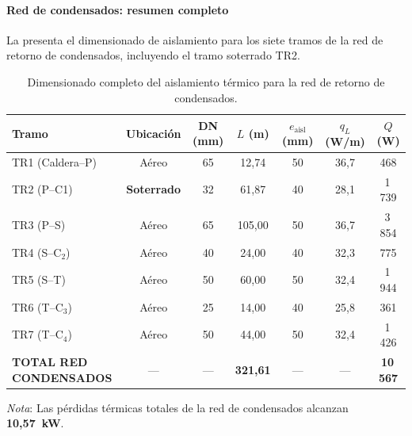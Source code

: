 \documentclass[12pt]{article}
\begin{document}
\paragraph{Red de condensados: resumen completo}
\label{par:resumen_cond_completo}

La  presenta el dimensionado de aislamiento para los siete tramos de la red de retorno de condensados, incluyendo el tramo soterrado TR2.

\begin{table}[htbp]
	\centering
	\caption{Dimensionado completo del aislamiento térmico para la red de retorno de condensados.}
	\label{tab:resumen_cond_completo}
	\begin{tabular}{lcccccc}
		\toprule
		\textbf{Tramo}                 & \textbf{Ubicación} & \textbf{DN (mm)} & \textbf{$L$ (m)}  & \textbf{$e_{\text{aisl}}$ (mm)} & \textbf{$q_L$ (W/m)} & \textbf{$Q$ (W)} \\
		\midrule
		TR1 (Caldera--P)               & Aéreo              & 65               & 12{,}74           & 50                              & 36{,}7               & 468              \\
		TR2 (P--C1)                 & \textbf{Soterrado} & 32               & 61{,}87           & 40                              & 28{,}1               & 1\,739           \\
		TR3 (P--S)                     & Aéreo              & 65               & 105{,}00          & 50                              & 36{,}7               & 3\,854           \\
		TR4 (S--C$_2$)                 & Aéreo              & 40               & 24{,}00           & 40                              & 32{,}3               & 775              \\
		TR5 (S--T)                     & Aéreo              & 50               & 60{,}00           & 50                              & 32{,}4               & 1\,944           \\
		TR6 (T--C$_3$)                 & Aéreo              & 25               & 14{,}00           & 40                              & 25{,}8               & 361              \\
		TR7 (T--C$_4$)                 & Aéreo              & 50               & 44{,}00           & 50                              & 32{,}4               & 1\,426           \\
		\midrule
		\textbf{TOTAL RED CONDENSADOS} & ---                & ---              & \textbf{321{,}61} & ---                             & ---                  & \textbf{10\,567} \\
		\bottomrule
	\end{tabular}
	\vspace{0.3cm}

	\noindent \small \textit{Nota}: Las pérdidas térmicas totales de la red de condensados alcanzan \textbf{10{,}57~kW}.
\end{table}
\end{document}
